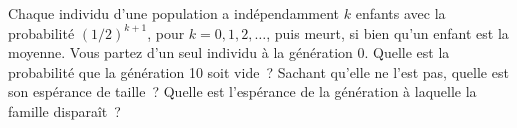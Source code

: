 \begin{question}\label{iq:iv1:waiting-times-and-markov-chains:25}
Chaque individu d'une population a indépendamment $k$ enfants avec la probabilité $(1/2)^{k+1}$, pour $k = 0, 1, 2, \dots$, puis meurt, si bien qu'un enfant est la moyenne. Vous partez d'un seul individu à la génération 0. Quelle est la probabilité que la génération 10 soit vide~? Sachant qu'elle ne l'est pas, quelle est son espérance de taille~? Quelle est l'espérance de la génération à laquelle la famille disparaît~?
\end{question}
